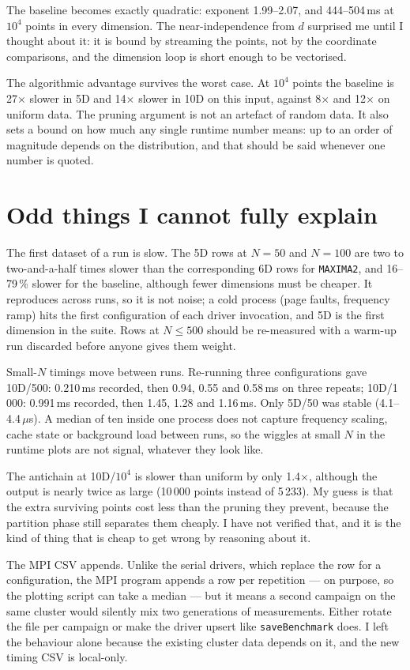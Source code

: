 \documentclass[11pt,a4paper]{article}
\newcommand{\code}[1]{\texttt{#1}}
\begin{document}
The baseline becomes exactly quadratic: exponent 1.99--2.07, and 444--504\,ms at
$10^4$ points in every dimension. The near-independence from $d$ surprised me
until I thought about it: it is bound by streaming the points, not by the
coordinate comparisons, and the dimension loop is short enough to be vectorised.

The algorithmic advantage survives the worst case. At $10^4$ points the baseline
is 27$\times$ slower in 5D and 14$\times$ slower in 10D on this input, against
8$\times$ and 12$\times$ on uniform data. The pruning argument is not an
artefact of random data. It also sets a bound on how much any single runtime
number means: up to an order of magnitude depends on the distribution, and
that should be said whenever one number is quoted.

\section{Odd things I cannot fully explain}

The first dataset of a run is slow. The 5D rows at $N=50$ and $N=100$ are two to
two-and-a-half times slower than the corresponding 6D rows for \code{MAXIMA2},
and 16--79\,\% slower for the baseline, although fewer dimensions must be
cheaper. It reproduces across runs, so it is not noise; a cold process (page
faults, frequency ramp) hits the first configuration of each driver invocation,
and 5D is the first dimension in the suite. Rows at $N\le500$ should be
re-measured with a warm-up run discarded before anyone gives them weight.

Small-$N$ timings move between runs. Re-running three configurations gave
10D/500: 0.210\,ms recorded, then 0.94, 0.55 and 0.58\,ms on three repeats;
10D/1\,000: 0.991\,ms recorded, then 1.45, 1.28 and 1.16\,ms. Only 5D/50 was
stable (4.1--4.4\,$\mu$s). A median of ten inside one process does not capture
frequency scaling, cache state or background load between runs, so the wiggles
at small $N$ in the runtime plots are not signal, whatever they look like.

The antichain at 10D/$10^4$ is slower than uniform by only 1.4$\times$, although
the output is nearly twice as large (10\,000 points instead of 5\,233). My guess
is that the extra surviving points cost less than the pruning they prevent,
because the partition phase still separates them cheaply. I have not verified
that, and it is the kind of thing that is cheap to get wrong by reasoning about
it.

The MPI CSV appends. Unlike the serial drivers, which replace the row for a
configuration, the MPI program appends a row per repetition --- on purpose, so
the plotting script can take a median --- but it means a second campaign on the
same cluster would silently mix two generations of measurements. Either rotate
the file per campaign or make the driver upsert like \code{saveBenchmark} does.
I left the behaviour alone because the existing cluster data depends on it, and
the new timing CSV is local-only.
\end{document}
